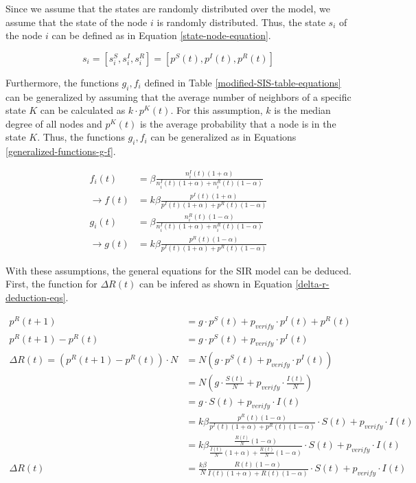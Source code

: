 Since we assume that the states are randomly distributed over the model, 
we assume that the state of the node $i$ is randomly distributed.
Thus, the state $s_i$ of the node $i$ can be defined as in Equation 
\ref{state-node-equation}.

\begin{equation}
    s_i = [s_i^S, s_i^I, s_i^R] = [p^S(t), p^I(t), p^R(t)]
    \label{state-node-equation}
\end{equation}

Furthermore, the functions $g_i,f_i$ defined in Table 
\ref{modified-SIS-table-equations}
can be generalized by assuming that the average number of neighbors 
of a specific state $K$ can be calculated as $k\cdot p^K(t)$. For this
assumption, $k$ is the median degree of all nodes and $p^K(t)$ is the 
average probability that a node is in the state $K$.
Thus, the functions $g_i,f_i$ can be generalized as in
Equations \ref{generalized-functions-g-f}.

\begin{subequations}
\begin{align}
    f_i(t) &= \beta \frac{n_i^I(t)(1+\alpha)}{n_i^I(t)(1+\alpha)+n_i^R(t)(1-\alpha)} 
    \nonumber\\
    \to f(t) &= k\beta \frac{p^I(t)(1+\alpha)}{p^I(t)(1+\alpha)+p^R(t)(1-\alpha)}
    \label{generalized-function-f} \\
    g_i(t) &= \beta \frac{n_i^R(t)(1-\alpha)}{n_i^I(t)(1+\alpha)+n_i^R(t)(1-\alpha)} 
    \nonumber \\
    \to g(t) &= k\beta \frac{p^R(t)(1-\alpha)}{p^I(t)(1+\alpha)+p^R(t)(1-\alpha)}
    \label{generalized-function-g}
\end{align}
\label{generalized-functions-g-f}
\end{subequations}

With these assumptions, the general equations for the SIR model can 
be deduced. First, the function for $\Delta R(t)$ can be infered
as shown in Equation \ref{delta-r-deduction-eqs}.

\begin{align}
    p^R(t+1) &= g \cdot p^S(t) + p_{verify}\cdot p^I(t) + p^R(t) \nonumber\\
    p^R(t+1) - p^R(t) &= g \cdot p^S(t) + p_{verify}\cdot p^I(t) \nonumber\\
    \Delta R(t) = (p^R(t+1) - p^R(t))\cdot N 
    &= N(g \cdot p^S(t) + p_{verify}\cdot p^I(t)) \nonumber\\
    &= N(g \cdot \frac{S(t)}{N} + p_{verify}\cdot \frac{I(t)}{N} ) \nonumber\\
    &= g \cdot S(t) + p_{verify}\cdot I(t) \nonumber\\
    &= k\beta \frac{p^R(t)(1-\alpha)}{p^I(t)(1+\alpha)+p^R(t)(1-\alpha)} 
    \cdot S(t) + p_{verify}\cdot I(t) \nonumber\\
    &= k\beta \frac{\frac{R(t)}{N}(1-\alpha)}{\frac{I(t)}{N}(1+\alpha)+\frac{R(t)}{N}(1-\alpha)} 
    \cdot S(t) + p_{verify}\cdot I(t) \nonumber\\
    \Delta R(t) &= \frac{k\beta}{N} \frac{R(t)(1-\alpha)}{I(t)(1+\alpha)+R(t)(1-\alpha)} 
    \cdot S(t) + p_{verify}\cdot I(t) \label{delta-r-deduction-eqs}
\end{align}

